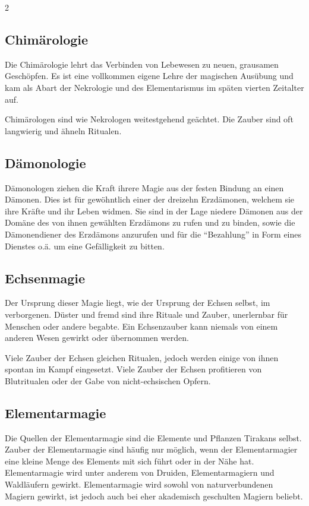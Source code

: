 \begin{multicols*}{2}
\subsection{Chimärologie}\label{subsec:chimarologie}

Die Chimärologie lehrt das Verbinden von Lebewesen zu neuen, grausamen Geschöpfen.
Es ist eine vollkommen eigene Lehre der magischen Ausübung und kam als Abart der Nekrologie und des Elementarismus im späten vierten Zeitalter auf.

Chimärologen sind wie Nekrologen weitestgehend geächtet.
Die Zauber sind oft langwierig und ähneln Ritualen.

\subsection{Dämonologie}\label{subsec:damonologie}

Dämonologen ziehen die Kraft ihrere Magie aus der festen Bindung an einen Dämonen.
Dies ist für gewöhntlich einer der dreizehn Erzdämonen, welchem sie ihre Kräfte und ihr Leben widmen.
Sie sind in der Lage niedere Dämonen aus der Domäne des von ihnen gewählten Erzdämons zu rufen und zu binden, sowie die Dämonendiener des Erzdämons anzurufen und für die ``Bezahlung'' in Form eines Dienstes o.ä. um eine Gefälligkeit zu bitten.

\subsection{Echsenmagie}\label{subsec:echsenmagie}

Der Ursprung dieser Magie liegt, wie der Ursprung der Echsen selbst, im verborgenen. Düster und fremd sind ihre Rituale und Zauber, unerlernbar für Menschen oder andere begabte. Ein Echsenzauber kann niemals von einem anderen Wesen gewirkt oder übernommen werden.

Viele Zauber der Echsen gleichen Ritualen, jedoch werden einige von ihnen spontan im Kampf eingesetzt.
Viele Zauber der Echsen profitieren von Blutritualen oder der Gabe von nicht-echsischen Opfern.

\subsection{Elementarmagie}\label{subsec:elementarmagie}

Die Quellen der Elementarmagie sind die Elemente und Pflanzen Tirakans selbst.
Zauber der Elementarmagie sind häufig nur möglich, wenn der Elementarmagier eine kleine Menge des Elements mit sich führt oder in der Nähe hat.
Elementarmagie wird unter anderem von Druiden, Elementarmagiern und Waldläufern gewirkt.
Elementarmagie wird sowohl von naturverbundenen Magiern gewirkt, ist jedoch auch bei eher akademisch geschulten Magiern beliebt.


\end{multicols*}
